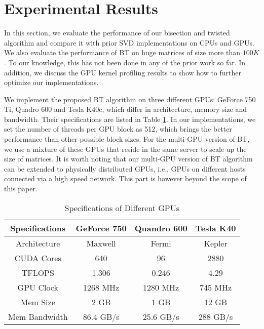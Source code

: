 \section{Experimental Results}
\label{sec:results}
In this section, we evaluate the performance of our bisection and twisted
algorithm and compare it with prior SVD implementations on CPUs and GPUs.
We also evaluate the performance of BT on huge matrices 
of size more than $100K$. To our knowledge, this has not been done in
any of the prior work so far. 
In addition, we discuss the GPU kernel profiling results to show
how to further optimize our implementations. 

We implement the proposed BT algorithm on three different GPUs: GeForce 750 Ti, Quadro 600 and Tesla K40c,
which differ in architecture, memory size and bandwidth.
Their specifications are listed in Table \ref{tab:spec}. In our
implementations, we set the number of threads per GPU block as 512, 
which brings the better performance than other possible block sizes.
For the multi-GPU version of BT, we use a mixture of these GPUs that 
reside in the same server to scale up the size of matrices. It is worth
noting that our multi-GPU version of BT algorithm can be extended to 
physically distributed GPUs, i.e., GPUs on different hosts connected via a high speed network. This part is however beyond the scope of this paper. 
\begin{table}[h]
\caption{Specifications of Different GPUs}
\centering
\begin{tabular}{|c|c|c|c|}
\hline
Specifications & GeForce 750 & Quandro 600 & Tesla K40 \\ \hline
Architecture   &     Maxwell &       Fermi &    Kepler \\ \hline
CUDA Cores     &         640 &          96 &      2880 \\ \hline
TFLOPS         &       1.306 &       0.246 &      4.29 \\ \hline
GPU Clock      &    1268 MHz &    1280 MHz &   745 MHz \\ \hline
Mem Size       &        2 GB &        1 GB &     12 GB \\ \hline
Mem Bandwidth  &   86.4 GB/s &   25.6 GB/s &  288 GB/s \\ \hline
\end{tabular}
\label{tab:spec}
\vspace{-0.1in}
\end{table}

